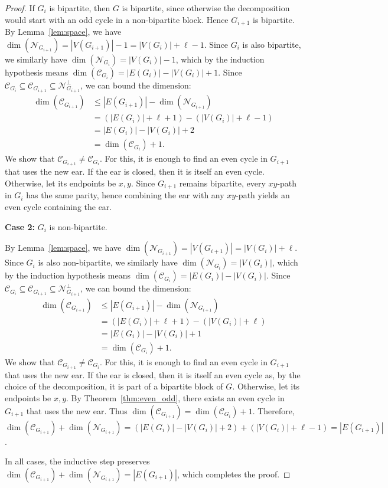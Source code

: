 \documentclass{article}
\theoremstyle{plain}
\theoremstyle{definition}
\newcommand{\cC}{\mathcal{C}}
\newcommand{\cN}{\mathcal{N}}
\begin{document}
\begin{proof}
    If $G_i$ is bipartite, then $G$ is bipartite, since otherwise the decomposition would start with an odd cycle in a non-bipartite block. Hence $G_{i+1}$ is bipartite. By Lemma~\ref{lem:space}, we have $\dim(\cN_{G_{i+1}}) = |V(G_{i+1})| - 1 = |V(G_i)| + \ell - 1$. Since $G_i$ is also bipartite, we similarly have $\dim(\cN_{G_i}) = |V(G_i)| - 1$, which by the induction hypothesis means $\dim(\cC_{G_i}) = |E(G_i)| - |V(G_i)| + 1$. Since $\cC_{G_i} \subseteq \cC_{G_{i+1}} \subseteq \cN_{G_{i+1}}^{\perp}$, we can bound the dimension:
    \begin{align*}
    \dim(\cC_{G_{i+1}}) 
    &\le |E(G_{i+1})| - \dim(\cN_{G_{i+1}})\\
    &= (|E(G_i)| + \ell + 1) - (|V(G_i)| + \ell - 1)\\
    &= |E(G_i)| - |V(G_i)| + 2\\
    &= \dim(\cC_{G_i}) + 1.
    \end{align*}
    We show that $\cC_{G_{i+1}} \neq \cC_{G_i}$. For this, it is enough to find an even cycle in $G_{i+1}$ that uses the new ear. If the ear is closed, then it is itself an even cycle. Otherwise, let its endpoints be $x,y$. Since $G_{i+1}$ remains bipartite, every $xy$-path in $G_i$ has the same parity, hence combining the ear with any $xy$-path yields an even cycle containing the ear.
    \medskip

    \noindent\textbf{Case 2:} $G_i$ is non-bipartite.

    By Lemma~\ref{lem:space}, we have $\dim(\cN_{G_{i+1}}) = |V(G_{i+1})| = |V(G_i)| + \ell$. Since $G_i$ is also non-bipartite, we similarly have $\dim(\cN_{G_i}) = |V(G_i)|$, which by the induction hypothesis means $\dim(\cC_{G_i}) = |E(G_i)| - |V(G_i)|$. Since $\cC_{G_i} \subseteq \cC_{G_{i+1}} \subseteq \cN_{G_{i+1}}^{\perp}$, we can bound the dimension:
    \begin{align*}
    \dim(\cC_{G_{i+1}}) 
    &\le |E(G_{i+1})| - \dim(\cN_{G_{i+1}})\\
    &= (|E(G_i)| + \ell + 1) - (|V(G_i)| + \ell)\\
    &= |E(G_i)| - |V(G_i)| + 1\\
    &= \dim(\cC_{G_i}) + 1.
    \end{align*}
    We show that $\cC_{G_{i+1}} \neq \cC_{G_i}$. For this, it is enough to find an even cycle in $G_{i+1}$ that uses the new ear. If the ear is closed, then it is itself an even cycle as, by the choice of the decomposition, it is part of a bipartite block of $G$. Otherwise, let its endpoints be $x,y$. By Theorem~\ref{thm:even_odd}, there exists an even cycle in $G_{i+1}$ that uses the new ear. Thus $\dim(\cC_{G_{i+1}}) = \dim(\cC_{G_i}) + 1$. Therefore, $\dim(\cC_{G_{i+1}}) + \dim(\cN_{G_{i+1}}) = (|E(G_i)| - |V(G_i)| + 2) + (|V(G_i)| + \ell - 1) = |E(G_{i+1})|$.
    \medskip
    
    In all cases, the inductive step preserves $\dim(\cC_{G_{i+1}}) + \dim(\cN_{G_{i+1}}) = |E(G_{i+1})|$, which completes the proof.
\end{proof}
\end{document}
